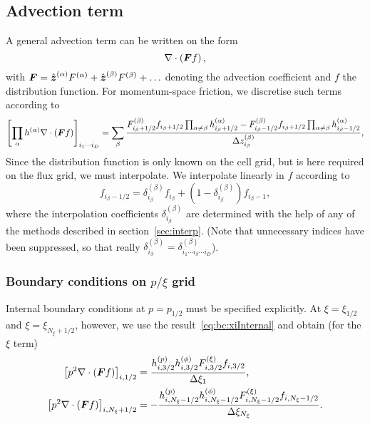\documentclass{notes}
\begin{document}
    \subsection{Advection term}
    A general advection term can be written on the form
    \begin{equation*}
        \nabla\cdot\left( \boldsymbol{F} f \right),
    \end{equation*}
    with $\boldsymbol{F} = \hat{\boldsymbol{z}}^{(\alpha)}F^{(\alpha)} + \hat{\boldsymbol{z}}^{(\beta)}F^{(\beta)}+\ldots$
    denoting the advection coefficient and $f$ the distribution function. For
    momentum-space friction, we discretise such terms according to
    \begin{equation}
        \left[\prod_\alpha h^{(\alpha)} \nabla\cdot\left( \boldsymbol{F}f \right) \right]_{i_1\cdots i_D} =
            \sum_\beta \frac{
                F^{(\beta)}_{i_\beta+1/2}f_{i_\beta+1/2}\prod_{\alpha\neq\beta} h^{(\alpha)}_{i_\beta+1/2} -
                F^{(\beta)}_{i_\beta-1/2}f_{i_\beta+1/2}\prod_{\alpha\neq\beta} h^{(\alpha)}_{i_\beta-1/2}
            }{\Delta z^{(\beta)}_{i_\beta}},
    \end{equation}
    Since the distribution function is only known on the cell grid, but is here
    required on the flux grid, we must interpolate. We interpolate linearly in
    $f$ according to
    \begin{equation}
        f_{i_\beta-1/2} = \delta^{(\beta)}_{i_\beta} f_{i_\beta} + \left( 1 - \delta^{(\beta)}_{i_\beta} \right) f_{i_\beta-1},
    \end{equation}
    where the interpolation coefficients $\delta^{(\beta)}_{i_\beta}$ are
    determined with the help of any of the methods described in
    section~\ref{sec:interp}. (Note that unnecessary indices have been
    suppressed, so that really
    $\delta^{(\beta)}_{i_\beta} = \delta^{(\beta)}_{i_1\cdots i_\beta\cdots i_D}$).

    \subsubsection{Boundary conditions on $p/\xi$ grid}
    Internal boundary conditions at $p=p_{1/2}$ must be specified explicitly.
    At $\xi=\xi_{1/2}$ and $\xi=\xi_{N_\xi+1/2}$, however, we use the
    result~\eqref{eq:bc:xiInternal} and obtain (for the $\xi$ term)
    \begin{equation}
        \begin{aligned}
            \left[ p^2\nabla\cdot\left( \boldsymbol{F} f \right) \right]_{i,1/2} &=
                \frac{h^{(p)}_{i,3/2}h^{(\phi)}_{i,3/2} F^{(\xi)}_{i,3/2} f_{i,3/2}}{\Delta\xi_{1}},\\
            \left[ p^2\nabla\cdot\left( \boldsymbol{F} f \right) \right]_{i,N_\xi+1/2} &=
                -\frac{h^{(p)}_{i,N_\xi-1/2}h^{(\phi)}_{i,N_\xi-1/2} F^{(\xi)}_{i,N_\xi-1/2} f_{i,N_\xi-1/2}}{\Delta\xi_{N_\xi}}.
        \end{aligned}
    \end{equation}
\end{document}
